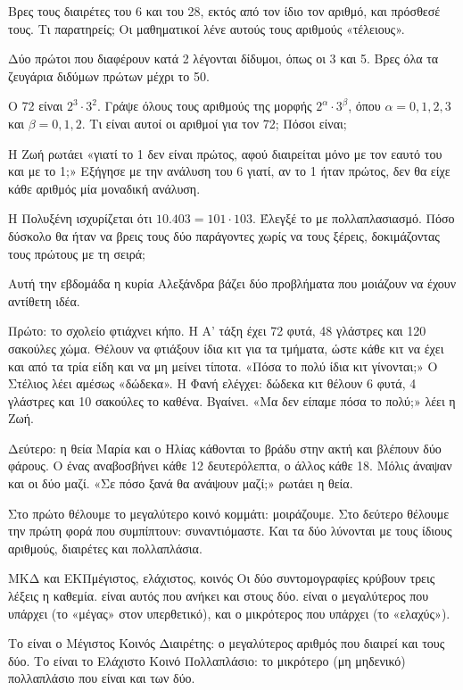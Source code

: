 
\ex Βρες τους διαιρέτες του 6 και του 28, εκτός από τον ίδιο τον αριθμό, και πρόσθεσέ τους. Τι παρατηρείς; Οι μαθηματικοί λένε αυτούς τους αριθμούς «τέλειους».

\ex Δύο πρώτοι που διαφέρουν κατά 2 λέγονται δίδυμοι, όπως οι 3 και 5. Βρες όλα τα ζευγάρια διδύμων πρώτων μέχρι το 50.

\ex Ο 72 είναι $2^3\cdot 3^2$. Γράψε όλους τους αριθμούς της μορφής $2^{\alpha}\cdot 3^{\beta}$, όπου $\alpha=0,1,2,3$ και $\beta=0,1,2$. Τι είναι αυτοί οι αριθμοί για τον 72; Πόσοι είναι;

\ex Η Ζωή ρωτάει «γιατί το 1 δεν είναι πρώτος, αφού διαιρείται μόνο με τον εαυτό του και με το 1;» Εξήγησε με την ανάλυση του 6 γιατί, αν το 1 ήταν πρώτος, δεν θα είχε κάθε αριθμός μία μοναδική ανάλυση.

\ex Η Πολυξένη ισχυρίζεται ότι $10.403=101\cdot 103$. Έλεγξέ το με πολλαπλασιασμό. Πόσο δύσκολο θα ήταν να βρεις τους δύο παράγοντες χωρίς να τους ξέρεις, δοκιμάζοντας τους πρώτους με τη σειρά;


\begin{anagke}
Αυτή την εβδομάδα η κυρία Αλεξάνδρα βάζει δύο προβλήματα που μοιάζουν να έχουν αντίθετη ιδέα.

Πρώτο: το σχολείο φτιάχνει κήπο. Η Α’ τάξη έχει 72 φυτά, 48 γλάστρες και 120 σακούλες χώμα. Θέλουν να φτιάξουν ίδια κιτ για τα τμήματα, ώστε κάθε κιτ να έχει και από τα τρία είδη και να μη μείνει τίποτα. «Πόσα το πολύ ίδια κιτ γίνονται;» Ο Στέλιος λέει αμέσως «δώδεκα». Η Φανή ελέγχει: δώδεκα κιτ θέλουν 6 φυτά, 4 γλάστρες και 10 σακούλες το καθένα. Βγαίνει. «Μα δεν είπαμε πόσα το πολύ;» λέει η Ζωή.

Δεύτερο: η θεία Μαρία και ο Ηλίας κάθονται το βράδυ στην ακτή και βλέπουν δύο φάρους. Ο ένας αναβοσβήνει κάθε 12 δευτερόλεπτα, ο άλλος κάθε 18. Μόλις άναψαν και οι δύο μαζί. «Σε πόσο ξανά θα ανάψουν μαζί;» ρωτάει η θεία.

Στο πρώτο θέλουμε το μεγαλύτερο κοινό κομμάτι: μοιράζουμε. Στο δεύτερο θέλουμε την πρώτη φορά που συμπίπτουν: συναντιόμαστε. Και τα δύο λύνονται με τους ίδιους αριθμούς, διαιρέτες και πολλαπλάσια.
\end{anagke}

\begin{lexi}{ΜΚΔ και ΕΚΠ}{μέγιστος, ελάχιστος, κοινός}
Οι δύο συντομογραφίες κρύβουν τρεις λέξεις η καθεμία.  είναι αυτός που ανήκει και στους δύο.  είναι ο μεγαλύτερος που υπάρχει (το «μέγας» στον υπερθετικό), και  ο μικρότερος που υπάρχει (το «ελαχύς»).

Το  είναι ο Μέγιστος Κοινός Διαιρέτης: ο μεγαλύτερος αριθμός που διαιρεί και τους δύο. Το  είναι το Ελάχιστο Κοινό Πολλαπλάσιο: το μικρότερο (μη μηδενικό) πολλαπλάσιο που είναι και των δύο.
\end{lexi}


